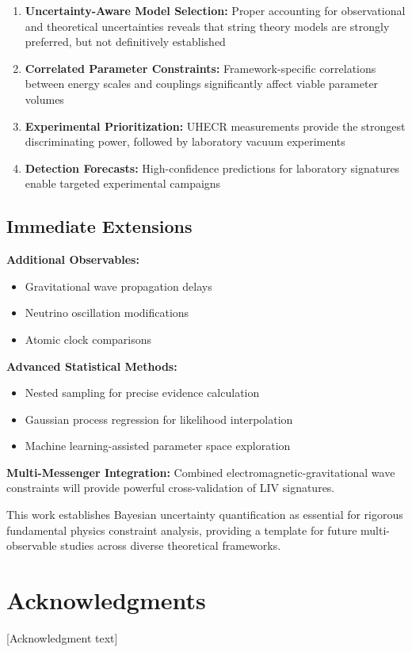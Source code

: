 \documentclass[12pt]{article}
\begin{document}
\begin{enumerate}
\item \textbf{Uncertainty-Aware Model Selection:} Proper accounting for observational and theoretical uncertainties reveals that string theory models are strongly preferred, but not definitively established

\item \textbf{Correlated Parameter Constraints:} Framework-specific correlations between energy scales and couplings significantly affect viable parameter volumes

\item \textbf{Experimental Prioritization:} UHECR measurements provide the strongest discriminating power, followed by laboratory vacuum experiments

\item \textbf{Detection Forecasts:} High-confidence predictions for laboratory signatures enable targeted experimental campaigns
\end{enumerate}

\subsection{Immediate Extensions}

\textbf{Additional Observables:}
\begin{itemize}
\item Gravitational wave propagation delays
\item Neutrino oscillation modifications  
\item Atomic clock comparisons
\end{itemize}

\textbf{Advanced Statistical Methods:}
\begin{itemize}
\item Nested sampling for precise evidence calculation
\item Gaussian process regression for likelihood interpolation
\item Machine learning-assisted parameter space exploration
\end{itemize}

\textbf{Multi-Messenger Integration:}
Combined electromagnetic-gravitational wave constraints will provide powerful cross-validation of LIV signatures.

This work establishes Bayesian uncertainty quantification as essential for rigorous fundamental physics constraint analysis, providing a template for future multi-observable studies across diverse theoretical frameworks.

\section*{Acknowledgments}

[Acknowledgment text]



\end{document}
